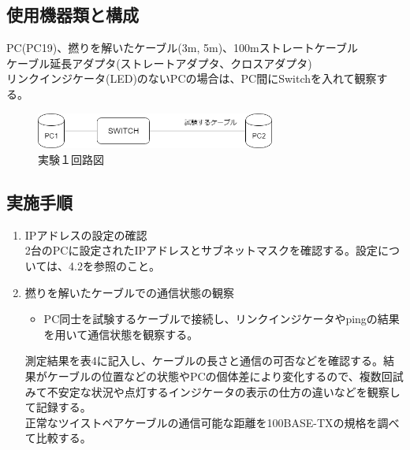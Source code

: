 \documentclass[10pt]{article}
\begin{document}
\subsection{使用機器類と構成}
PC(PC19)、撚りを解いたケーブル(3m, 5m)、100mストレートケーブル\\
ケーブル延長アダプタ(ストレートアダプタ、クロスアダプタ)\\ リンクインジケータ(LED)のないPCの場合は、PC間にSwitchを入れて観察する。
\begin{figure}[H]
		\centering
		\includegraphics[width=0.7\textwidth]{zuni.png}
		\caption{実験１回路図}
	\end{figure}

\subsection{実施手順}

\begin{enumerate}
    \item IPアドレスの設定の確認 \\
    2台のPCに設定されたIPアドレスとサブネットマスクを確認する。設定については、4.2を参照のこと。
    \item 撚りを解いたケーブルでの通信状態の観察
    \begin{itemize}
        \item PC同士を試験するケーブルで接続し、リンクインジケータやpingの結果を用いて通信状態を観察する。
    \end{itemize}
    
    測定結果を表4に記入し、ケーブルの長さと通信の可否などを確認する。結果がケーブルの位置などの状態やPCの個体差により変化するので、複数回試みて不安定な状況や点灯するインジケータの表示の仕方の違いなどを観察して記録する。\\正常なツイストペアケーブルの通信可能な距離を100BASE-TXの規格を調べて比較する。
    
\end{enumerate}
\end{document}
